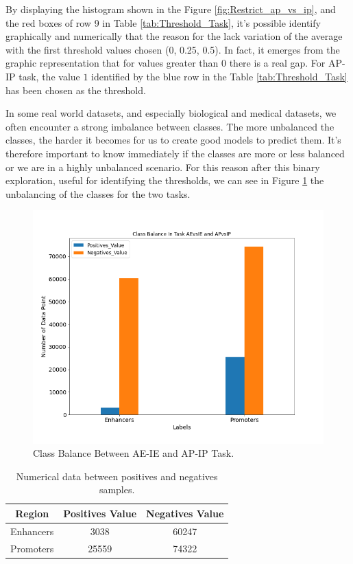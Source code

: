 \documentclass{article}
\begin{document}
\noindent\newline
By displaying the histogram shown in the Figure \ref{fig:Restrict_ap_vs_ip}, and the red boxes of row 9 in Table \ref{tab:Threshold_Task}, it's possible identify graphically and numerically that the reason for the lack variation of the average with the first threshold values chosen (0, 0.25, 0.5). In fact, it emerges from the graphic representation that for values greater than 0 there is a real gap. For \acrshort{AP-IP} task, the value $1$ identified by the blue row in the Table \ref{tab:Threshold_Task} has been chosen as the threshold.

\noindent\newline
In some real world datasets, and especially biological and medical datasets, we often encounter a strong imbalance between classes. The more unbalanced the classes, the harder it becomes for us to create good models to predict them. It's therefore important to know immediately if the classes are more or less balanced or we are in a highly unbalanced scenario. For this reason after this binary exploration, useful for identifying the thresholds, we can see in Figure \ref{fig:Class_Balance} the unbalancing of the classes for the two tasks.

\begin{figure}
    \centering
    \includegraphics[width=12cm]{image/Class_Balance_AEvsIE_and_APvsIP.png}
    \caption{Class Balance Between \acrshort{AE-IE} and \acrshort{AP-IP} Task.}
    \label{fig:Class_Balance}
\end{figure}

\begin{table}
\begin{center}
\begin{tabular}{ | c | c | c |}
\hline
Region & Positives Value & Negatives Value \\
\hline
Enhancers & 3038 & 60247 \\
\hline
Promoters & 25559 & 74322 \\
\hline
\end{tabular}
\caption{\label{tab:Imbalance_Numerical} Numerical data between positives and negatives samples.}
\end{center}
\end{table}
\end{document}
